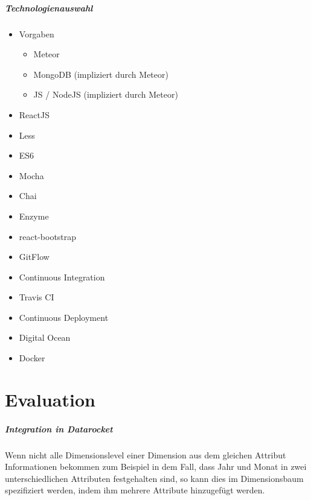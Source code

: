 \documentclass[
  language=german, %
  type=bachelor%
]{isthesis}
\begin{document}
\begin{content}
  \paragraph{Technologienauswahl}
  \begin{itemize}
    \item Vorgaben
      \begin{itemize}
        \item Meteor
        \item MongoDB (impliziert durch Meteor)
        \item JS / NodeJS (impliziert durch Meteor)
      \end{itemize}
    \item ReactJS
    \item Less
    \item ES6
    \item Mocha
    \item Chai
    \item Enzyme
    \item react-bootstrap
  \end{itemize}

  \begin{itemize}
    \item GitFlow
    \item Continuous Integration
    \item Travis CI
    \item Continuous Deployment
    \item Digital Ocean
    \item Docker
  \end{itemize}


\chapter{Evaluation}
 \paragraph{Integration in \textit{Datarocket}}
 Wenn nicht alle Dimensionslevel einer Dimension aus dem gleichen Attribut
 Informationen bekommen zum Beispiel in dem Fall, dass Jahr und Monat in zwei
 unterschiedlichen Attributen festgehalten sind, so kann dies im Dimensionsbaum
 spezifiziert werden, indem ihm mehrere Attribute hinzugefügt werden.


\end{content}
\end{document}
